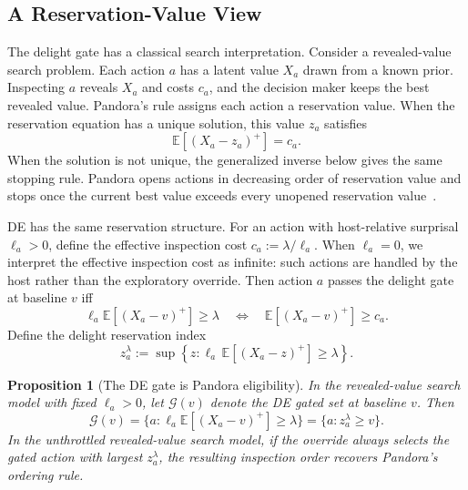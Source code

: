 \documentclass{article}
\newtheorem{proposition} {Proposition}
\newcommand{\Gc}{\mathcal{G}}
\newcommand{\E}{\mathbb{E}}
\newcommand{\surp}{\ell} %
\begin{document}
\subsection{A Reservation-Value View}
\label{sec:reservation}

The delight gate has a classical search interpretation.
Consider a revealed-value search problem.
Each action $a$ has a latent value $X_a$ drawn from a known prior.
Inspecting $a$ reveals $X_a$ and costs $c_a$, and the decision maker keeps the best revealed value.
Pandora's rule assigns each action a reservation value.
When the reservation equation has a unique solution, this value $z_a$ satisfies
\begin{equation}
\label{eq:pandora_reservation}
  \E[(X_a-z_a)^+] = c_a .
\end{equation}
When the solution is not unique, the generalized inverse below gives the same stopping rule.
Pandora opens actions in decreasing order of reservation value and stops once the current best value exceeds every unopened reservation value~\citep{weitzman1979optimal}.



DE has the same reservation structure.
For an action with host-relative surprisal $\surp_a>0$, define the effective inspection cost $c_a := \lambda/\surp_a$.
When $\surp_a=0$, we interpret the effective inspection cost as infinite: such actions are handled by the host rather than the exploratory override.
Then action $a$ passes the delight gate at baseline $v$ iff
\[
  \surp_a\E[(X_a-v)^+] \ge \lambda
  \quad\Longleftrightarrow\quad
  \E[(X_a-v)^+] \ge c_a.
\]
Define the delight reservation index
\begin{equation}
\label{eq:delight_reservation}
  z_a^\lambda
  :=
  \sup\left\{
    z:\surp_a\,\E[(X_a-z)^+] \ge \lambda
  \right\}.
\end{equation}

\begin{proposition}[The DE gate is Pandora eligibility]
\label{prop:pandora_gate}
In the revealed-value search model with fixed $\surp_a>0$, let $\Gc(v)$ denote the DE gated set at baseline $v$.
Then
\[
  \Gc(v)
  =
  \{a:\surp_a\E[(X_a-v)^+]\ge\lambda\}
  =
  \{a:z_a^\lambda\ge v\}.
\]
In the unthrottled revealed-value search model, if the override always selects the gated action with largest $z_a^\lambda$, the resulting inspection order recovers Pandora's ordering rule.
\end{proposition}
\end{document}

